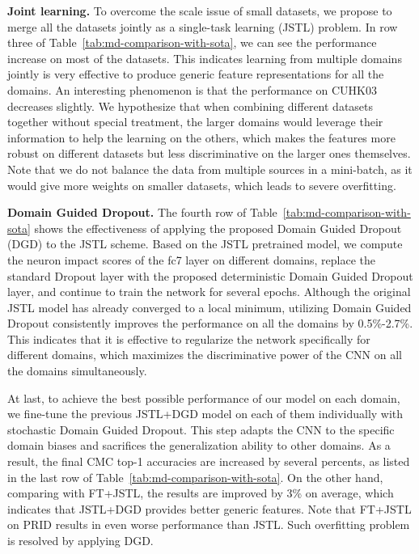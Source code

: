 \textbf{Joint learning.} To overcome the scale issue of small datasets, we propose to merge all the datasets jointly as a single-task learning (JSTL) problem. In row three of Table~\ref{tab:md-comparison-with-sota}, we can see the performance increase on most of the datasets. This indicates learning from multiple domains jointly is very effective to produce generic feature representations for all the domains. An interesting phenomenon is that the performance on CUHK03 decreases slightly. We hypothesize that when combining different datasets together without special treatment, the larger domains would leverage their information to help the learning on the others, which makes the features more robust on different datasets but less discriminative on the larger ones themselves. Note that we do not balance the data from multiple sources in a mini-batch, as it would give more weights on smaller datasets, which leads to severe overfitting.

\textbf{Domain Guided Dropout.} The fourth row of Table~\ref{tab:md-comparison-with-sota} shows the effectiveness of applying the proposed Domain Guided Dropout (DGD) to the JSTL scheme. Based on the JSTL pretrained model, we compute the neuron impact scores of the fc7 layer on different domains, replace the standard Dropout layer with the proposed deterministic Domain Guided Dropout layer, and continue to train the network for several epochs. Although the original JSTL model has already converged to a local minimum, utilizing Domain Guided Dropout consistently improves the performance on all the domains by 0.5\%-2.7\%. This indicates that it is effective to regularize the network specifically for different domains, which maximizes the discriminative power of the CNN on all the domains simultaneously.

At last, to achieve the best possible performance of our model on each domain, we fine-tune the previous JSTL+DGD model on each of them individually with stochastic Domain Guided Dropout. This step adapts the CNN to the specific domain biases and sacrifices the generalization ability to other domains. As a result, the final CMC top-1 accuracies are increased by several percents, as listed in the last row of Table~\ref{tab:md-comparison-with-sota}. On the other hand, comparing with FT+JSTL, the results are improved by 3\% on average, which indicates that JSTL+DGD provides better generic features. Note that FT+JSTL on PRID results in even worse performance than JSTL. Such overfitting problem is resolved by applying DGD.

